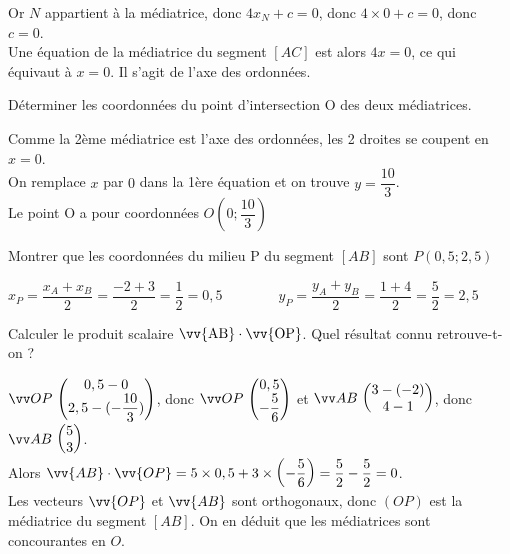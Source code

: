 \documentclass[12pt,a4paper]{article}  %
\begin{document}
\begin{enumMet}
\begin{corrBox}
        Or $N$ appartient à la médiatrice, donc $4x_{N}+c=0$, donc $4\times 0+c=0$, donc $c=0$.\\
        Une équation de la médiatrice du segment $[AC]$ est alors $4x=0$, ce qui équivaut à $x=0$. Il s'agit de l'axe des ordonnées.
    \end{corrBox}
    \item Déterminer les coordonnées du point d'intersection $\mathrm{O}$ des deux médiatrices.\\
    \begin{corrBox}
       Comme la 2ème médiatrice est l'axe des ordonnées, les 2 droites se coupent en $x=0$.\\
       On remplace $x$ par $0$ dans la 1ère équation et on trouve $y=\dfrac{10}{3}$.\\
       Le point O a pour coordonnées $O\left(0;\dfrac{10}{3}\right)$
    \end{corrBox}
    \item Montrer que les coordonnées du milieu P du segment $[AB]$ sont $P(0,5;2,5)$\\
    \begin{corrBox}
        $x_P=\dfrac{x_A+x_B}{2}=\dfrac{-2+3}{2}=\dfrac{1}{2}=0,5\quad \quad \quad \quad y_P=\dfrac{y_A+y_B}{2}=\dfrac{1+4}{2}=\dfrac{5}{2}=2,5$
    \end{corrBox}
    \item Calculer le produit scalaire $\vv{\mathrm{AB}} \cdot \vv{\mathrm{OP}}$. Quel résultat connu retrouve-t-on ?\\
    \begin{corrBox}
        $\Coord{OP}{0,5-0}{2,5-(-\dfrac{10}{3})}$, donc $\Coord{OP}{0,5}{-\dfrac{5}{6}}$ et $\Coord{AB}{3-(-2)}{4-1}$, donc $\Coord{AB}{5}{3}$.\\
        Alors $\vv{A B} \cdot \vv{OP}=5 \times 0,5+3 \times\left(-\dfrac{5}{6}\right)=\dfrac{5}{2}-\dfrac{5}{2}=0$.\\
        Les vecteurs $\vv{OP}$ et $\vv{AB}$ sont orthogonaux, donc $(OP)$ est la médiatrice du segment $[AB]$. On en déduit que les médiatrices sont concourantes en $O$.
    \end{corrBox}

\end{enumMet}
\end{document}
